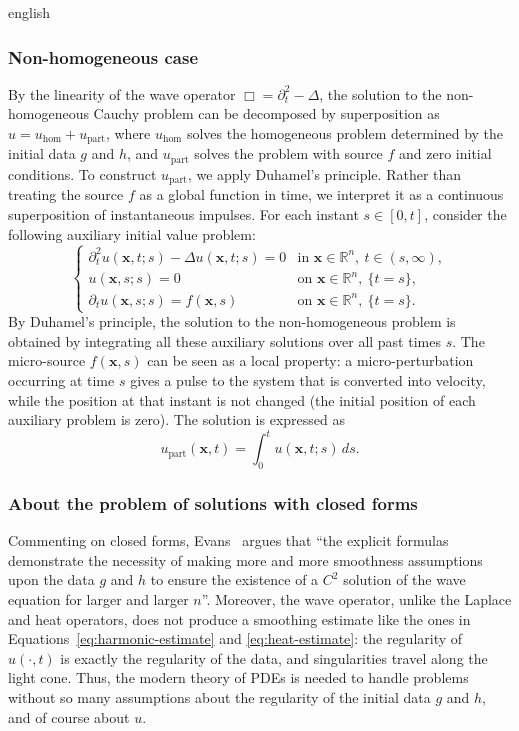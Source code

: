 \documentclass[12pt,letterpaper,twoside]{book}
\newif\ifreviewmode
\newcommand{\revtag}[2]{\ifreviewmode{\color{red!70!black}\textsf{\footnotesize[#1#2]}}\fi}
\newcommand{\verificar}[1]{\revtag{VERIFICAR}{: #1}}
\begin{document}
\begin{hyphenrules}{english}
\subsubsection{Non-homogeneous case}
By the linearity of the wave operator $\Box=\partial_t^2-\Delta$, the solution to the non-homogeneous
Cauchy problem can be decomposed by superposition as $u=u_{\mathrm{hom}}+u_{\mathrm{part}}$, where
$u_{\mathrm{hom}}$ solves the homogeneous problem determined by the initial data $g$ and $h$, and
$u_{\mathrm{part}}$ solves the problem with source $f$ and zero initial conditions. To construct
$u_{\mathrm{part}}$, we apply Duhamel's principle. Rather than treating the source $f$ as a global
function in time, we interpret it as a continuous superposition of instantaneous impulses. For each
instant $s\in[0,t]$, consider the following auxiliary initial value problem:
\begin{equation}
  \begin{cases}
    \partial_t^2u(\mathbf{x},t;s)-\Delta u(\mathbf{x},t;s)=0 & \text{in } \mathbf{x}\in\mathbb{R}^n,\ t\in(s,\infty),\\
    u(\mathbf{x},s;s)=0 & \text{on } \mathbf{x}\in\mathbb{R}^n,\ \{t=s\},\\
    \partial_t u(\mathbf{x},s;s)=f(\mathbf{x},s) & \text{on } \mathbf{x}\in\mathbb{R}^n,\ \{t=s\}.
  \end{cases}
  \label{eq:wave-duhamel-aux}
\end{equation}
By Duhamel's principle, the solution to the non-homogeneous problem is obtained by integrating all
these auxiliary solutions over all past times $s$. The micro-source $f(\mathbf{x},s)$ can be seen as a local
property: a micro-perturbation occurring at time $s$ gives a pulse to the system that is converted into
velocity, while the position at that instant is not changed (the initial position of each auxiliary
problem is zero). The solution is expressed as
\begin{equation}
  u_{\mathrm{part}}(\mathbf{x},t)=\int_0^t u(\mathbf{x},t;s)\,d s.
  \label{eq:wave-duhamel}
\end{equation}

\subsubsection{About the problem of solutions with closed forms}
Commenting on closed forms, Evans~\cite{evans2010} argues that ``the explicit formulas demonstrate the
necessity of making more and more smoothness assumptions upon the data $g$ and $h$ to ensure the
existence of a $C^2$ solution of the wave equation for larger and larger $n$''.\verificar{page number
of the quotation (required for direct quotes)} Moreover, the wave operator, unlike the Laplace
and heat operators, does not produce a smoothing estimate like the ones in
Equations~\eqref{eq:harmonic-estimate} and \eqref{eq:heat-estimate}: the regularity of $u(\cdot,t)$ is exactly the regularity
of the data, and singularities travel along the light cone. Thus, the modern theory of PDEs is needed
to handle problems without so many assumptions about the regularity of the initial data $g$ and $h$,
and of course about $u$.


\end{hyphenrules}
\end{document}
